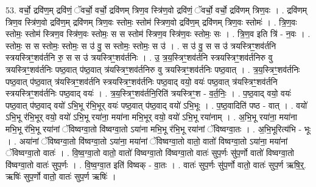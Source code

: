 \documentclass[17pt]{extarticle}
\begin{document}
53. वर्चो॒ द्रवि॑ण॒म् द्रवि॑णं॒ ॅवर्चो॒ वर्चो॒ द्रवि॑णम् त्रिण॒व स्त्रि॑ण॒वो द्रवि॑णं॒ ॅवर्चो॒ वर्चो॒ द्रवि॑णम् त्रिण॒वः । . द्रवि॑णम् त्रिण॒व स्त्रि॑ण॒वो द्रवि॑ण॒म् द्रवि॑णम् त्रिण॒वः स्तोमः॒ स्तोम॑ स्त्रिण॒वो द्रवि॑ण॒म् द्रवि॑णम् त्रिण॒वः स्तोमः॑ । . त्रि॒ण॒वः स्तोमः॒ स्तोम॑ स्त्रिण॒व स्त्रि॑ण॒वः स्तोमः॒ स स स्तोम॑ स्त्रिण॒व स्त्रि॑ण॒वः स्तोमः॒ सः । . त्रि॒ण॒व इति त्रि॑ - न॒वः । . स्तोमः॒ स स स्तोमः॒ स्तोमः॒ स उ॑ वु॒ स स्तोमः॒ स्तोमः॒ स उ॑ । . स उ॑ वु॒ स स उ॑ त्रयस्त्रिꣳ॒॒शव॑र्तनि स्त्रयस्त्रिꣳ॒॒शव॑र्तनि रु॒ स स उ॑ त्रयस्त्रिꣳ॒॒शव॑र्तनिः । . उ॒ त्र॒य॒स्त्रिꣳ॒॒शव॑र्तनि स्त्रयस्त्रिꣳ॒॒शव॑र्तनिरु वु त्रयस्त्रिꣳ॒॒शव॑र्तनिः पष्ठ॒वात् प॑ष्ठ॒वात् त्र॑यस्त्रिꣳ॒॒शव॑र्तनिरु वु त्रयस्त्रिꣳ॒॒शव॑र्तनिः पष्ठ॒वात् । . त्र॒य॒स्त्रिꣳ॒॒शव॑र्तनिः पष्ठ॒वात् प॑ष्ठ॒वात् त्र॑यस्त्रिꣳ॒॒शव॑र्तनि स्त्रयस्त्रिꣳ॒॒शव॑र्तनिः पष्ठ॒वाद् वयो॒ वयः॑ पष्ठ॒वात् त्र॑यस्त्रिꣳ॒॒शव॑र्तनि स्त्रयस्त्रिꣳ॒॒शव॑र्तनिः पष्ठ॒वाद् वयः॑ । . त्र॒य॒स्त्रिꣳ॒॒शव॑र्तनि॒रिति॑ त्रयस्त्रिꣳ॒॒श - व॒र्त॒निः॒ । . प॒ष्ठ॒वाद् वयो॒ वयः॑ पष्ठ॒वात् प॑ष्ठ॒वाद् वयो॑ ऽभि॒भू र॑भि॒भूर् वयः॑ पष्ठ॒वात् प॑ष्ठ॒वाद् वयो॑ ऽभि॒भूः । . प॒ष्ठ॒वादिति॑ पष्ठ - वात् । . वयो॑ ऽभि॒भू र॑भि॒भूर् वयो॒ वयो॑ ऽभि॒भू रया॑ना॒ मया॑ना मभि॒भूर् वयो॒ वयो॑ ऽभि॒भू रया॑नाम् । . अ॒भि॒भू रया॑ना॒ मया॑ना मभि॒भू र॑भि॒भू रया॑नां ॅविष्वग्वा॒तो वि॑ष्वग्वा॒तो ऽया॑ना मभि॒भू र॑भि॒भू रया॑नां ॅविष्वग्वा॒तः । . अ॒भि॒भूरित्य॑भि - भूः । . अया॑नां ॅविष्वग्वा॒तो वि॑ष्वग्वा॒तो ऽया॑ना॒ मया॑नां ॅविष्वग्वा॒तो वातो॒ वातो॑ विष्वग्वा॒तो ऽया॑ना॒ मया॑नां ॅविष्वग्वा॒तो वातः॑ । . वि॒ष्व॒ग्वा॒तो वातो॒ वातो॑ विष्वग्वा॒तो वि॑ष्वग्वा॒तो वातः॑ सुप॒र्णः सु॑प॒र्णो वातो॑ विष्वग्वा॒तो वि॑ष्वग्वा॒तो वातः॑ सुप॒र्णः । . वि॒ष्व॒ग्वा॒त इति॑ विष्वक् - वा॒तः । . वातः॑ सुप॒र्णः सु॑प॒र्णो वातो॒ वातः॑ सुप॒र्ण ऋषि॒र्॒. ऋषिः॑ सुप॒र्णो वातो॒ वातः॑ सुप॒र्ण ऋषिः॑ । \newline
\end{document}
